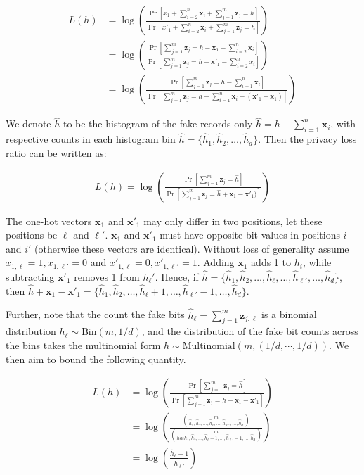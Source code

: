 \documentclass[11pt]{article}
\newcommand{\bbx}{\pmb{x}}
\newcommand{\bbz}{\pmb{z}}
\begin{document}
\begin{align*}
L(h) &= \log \left ( \frac{\Pr[x_1 + \sum^n_{i=2} \bbx_i + \sum^m_{j=1} \bbz_j = h]}{\Pr[x'_1 + \sum^n_{i=2} \bbx_i + \sum^m_{j=1} \bbz_j = h]} \right ) \\
&=  \log \left ( \frac{\Pr[\sum^m_{j=1} \bbz_j = h - \bbx_1 - \sum^n_{i=2} \bbx_i ]}{\Pr[ \sum^m_{j=1} \bbz_j = h - \bbx'_1 - \sum^n_{i=2} x_i ]} \right )  \\
&=  \log \left ( \frac{\Pr[\sum^m_{j=1} \bbz_j = h - \sum^n_{i=1}  \bbx_i ]}{\Pr[ \sum^m_{j=1} \bbz_j = h  - \sum^n_{i=1} \bbx_i  - (\bbx'_1 - \bbx_1) ]} \right )
\end{align*}

We denote  $\hat{h}$ to be the histogram of the fake records only $\hat{h} = h - \sum^n_{i=1} \bbx_i$, with respective counts in each histogram bin $\hat{h} = \{ \hat{h}_1, \hat{h}_2, \dots , \hat{h}_d\}$.  Then the privacy loss ratio can be written as:

\begin{align*}
L(h) =  \log \left ( \frac{\Pr[\sum^m_{j=1} \bbz_j = \hat{h} ]}{\Pr[ \sum^m_{j=1} \bbz_j = \hat{h}  + \bbx_1 - \bbx'_1) ]} \right )
\end{align*}


The one-hot vectors $\bbx_1$  and $\bbx'_1$ may only differ in two positions, let these positions be $\ell$ and $\ell'$. 
$\bbx_1$ and $\bbx'_1$ must have opposite bit-values in positions $i$ and $i'$ (otherwise these vectors are identical). 
Without loss of generality assume $x_{1,\ell} = 1, x_{1,\ell'} = 0$ and $x'_{1,\ell} = 0, x'_{1,\ell'} = 1$.  
Adding $\bbx_1$ adds 1 to $h_i$, while subtracting $\bbx'_1$ removes 1 from $h_\ell'$.
Hence,  if $\hat{h} = \{ \hat{h}_1, \hat{h}_2, \dots , \hat{h}_\ell, \dots, \hat{h}_{\ell'}, \dots, \hat{h}_d\} $, then  $\hat{h} + \bbx_1 -\bbx'_1 =  \{ \hat{h}_1, \hat{h}_2, \dots , \hat{h}_\ell + 1, \dots, \hat{h}_{\ell'} -1, \dots, \hat{h}_d\} $.

Further, note that the count the fake bits $\hat{h}_\ell = \sum^m_{j=1} \bbz_{j,\ell}$ is a binomial distribution $h_\ell \sim \text{Bin}(m, 1/d)$, and the distribution of the fake bit counts across the bins takes the multinomial form $ \hat{h} \sim \text{Multinomial}(m,(1/d,\cdots, 1/d))$. We then aim to bound the following quantity.

\begin{align*}
 L(h) &= \log \left ( \frac{\Pr[\sum^m_{j=1} \bbz_j = \hat{h} ]}{\Pr[ \sum^m_{j=1} \bbz_j = \hat{h} + \bbx_1 - \bbx'_1]} \right ) \\
 & = \log  \left ( \frac{ {m \choose \hat{h}_1, \hat{h}_2, \dots , \hat{h}_\ell, \dots, \hat{h}_{\ell'}, \dots, \hat{h}_d}}{ { m \choose hat{h}_1, \hat{h}_2, \dots , \hat{h}_\ell + 1, \dots, \hat{h}_{\ell'} - 1, \dots, \hat{h}_d}} \right ) \\
 & = \log  \left ( \frac{\hat{h}_\ell + 1}{\hat{h}_{\ell'}} \right ) 
\end{align*}
\end{document}
